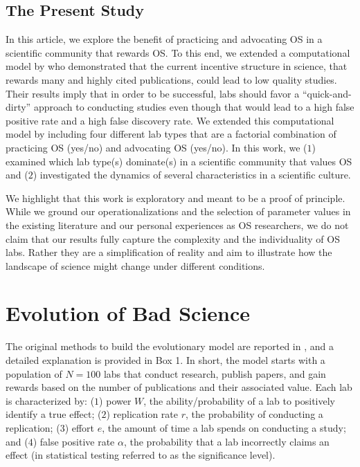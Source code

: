 \documentclass[meta, authordate]{jote-new-article}
\begin{document}
\subsection{The Present Study}

In this article, we explore the benefit of practicing and advocating OS in a scientific community that rewards OS. To this end, we extended a computational model by \textcite{SmaldinoMcelreath2016} who demonstrated that the current incentive structure in science, that rewards many and highly cited publications, could lead to low quality studies. Their results imply that in order to be successful, labs should favor a ``quick-and-dirty'' approach to conducting studies even though that would lead to a high false positive rate and a high false discovery rate. We extended this computational model by including four different lab types that are a factorial combination of practicing OS (yes/no) and advocating OS (yes/no). In this work, we ($1$) examined which lab type(s) dominate(s) in a scientific community that values OS and ($2$) investigated the dynamics of several characteristics in a scientific culture.

We highlight that this work is exploratory and meant to be a proof of principle. While we ground our operationalizations and the selection of parameter values in the existing literature and our personal experiences as OS researchers, we do not claim that our results fully capture the complexity and the individuality of OS labs. Rather they are a simplification of reality and aim to illustrate how the landscape of science might change under different conditions.

\section{Evolution of Bad Science}






The original methods to build the evolutionary model are reported in \textcite{SmaldinoMcelreath2016}, and a detailed explanation is provided in Box 1. In short, the model starts with a population of $N=100$ labs that conduct research, publish papers, and gain rewards based on the number of publications and their associated value. Each lab is characterized by: ($1$) power $W$, the ability/probability of a lab to positively identify a true effect; ($2$) replication rate $r$, the probability of conducting a replication; ($3$) effort $e$, the amount of time a lab spends on conducting a study; and ($4$) false positive rate $\alpha$, the probability that a lab incorrectly claims an effect (in statistical testing referred to as the significance level).
\end{document}

